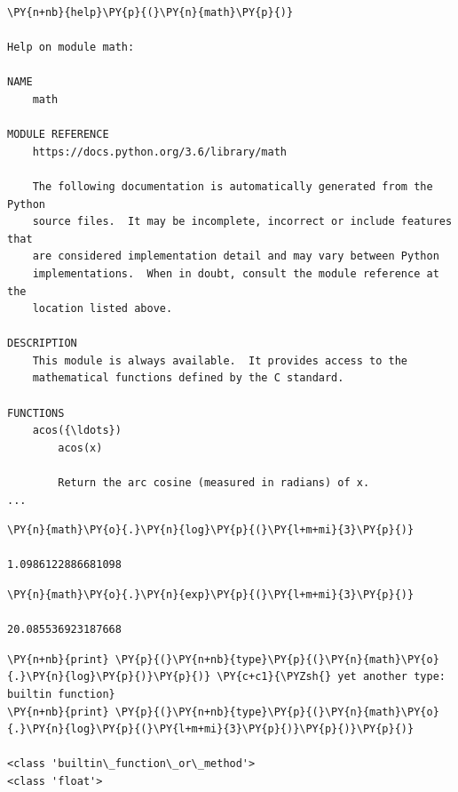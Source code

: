 \begin{codebox}            
\begin{Verbatim}[commandchars=\\\{\}]
\PY{n+nb}{help}\PY{p}{(}\PY{n}{math}\PY{p}{)}

Help on module math:

NAME
    math

MODULE REFERENCE
    https://docs.python.org/3.6/library/math

    The following documentation is automatically generated from the Python
    source files.  It may be incomplete, incorrect or include features that
    are considered implementation detail and may vary between Python
    implementations.  When in doubt, consult the module reference at the
    location listed above.

DESCRIPTION
    This module is always available.  It provides access to the
    mathematical functions defined by the C standard.

FUNCTIONS
    acos({\ldots})
        acos(x)

        Return the arc cosine (measured in radians) of x.
...
\end{Verbatim}
\end{codebox}

\begin{codebox}            
\begin{Verbatim}[commandchars=\\\{\}]
\PY{n}{math}\PY{o}{.}\PY{n}{log}\PY{p}{(}\PY{l+m+mi}{3}\PY{p}{)}

1.0986122886681098
\end{Verbatim}
\end{codebox}

\begin{codebox}            
\begin{Verbatim}[commandchars=\\\{\}]
\PY{n}{math}\PY{o}{.}\PY{n}{exp}\PY{p}{(}\PY{l+m+mi}{3}\PY{p}{)}

20.085536923187668
\end{Verbatim}
\end{codebox}

\begin{codebox}            
\begin{Verbatim}[commandchars=\\\{\}]
\PY{n+nb}{print} \PY{p}{(}\PY{n+nb}{type}\PY{p}{(}\PY{n}{math}\PY{o}{.}\PY{n}{log}\PY{p}{)}\PY{p}{)} \PY{c+c1}{\PYZsh{} yet another type: builtin function}
\PY{n+nb}{print} \PY{p}{(}\PY{n+nb}{type}\PY{p}{(}\PY{n}{math}\PY{o}{.}\PY{n}{log}\PY{p}{(}\PY{l+m+mi}{3}\PY{p}{)}\PY{p}{)}\PY{p}{)}

<class 'builtin\_function\_or\_method'>
<class 'float'>
\end{Verbatim}
\end{codebox}

